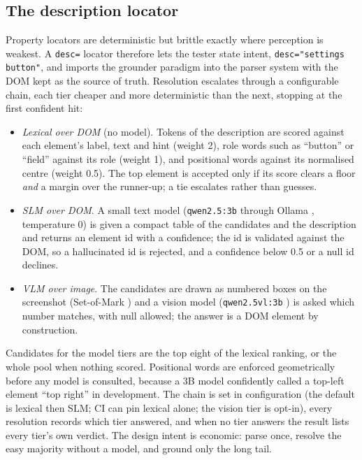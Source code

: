 \documentclass[conference]{IEEEtran}
\newcommand{\code}[1]{\texttt{#1}}
\begin{document}
\subsection{The description locator}
\label{sec:desc}
Property locators are deterministic but brittle exactly where perception is weakest. A \code{desc=} locator therefore lets the tester state intent, \code{desc="settings button"}, and imports the grounder paradigm into the parser system with the DOM kept as the source of truth. Resolution escalates through a configurable chain, each tier cheaper and more deterministic than the next, stopping at the first confident hit:
\begin{itemize}
  \item \emph{Lexical over DOM} (no model). Tokens of the description are scored against each element's label, text and hint (weight 2), role words such as ``button'' or ``field'' against its role (weight 1), and positional words against its normalised centre (weight 0.5). The top element is accepted only if its score clears a floor \emph{and} a margin over the runner-up; a tie escalates rather than guesses.
  \item \emph{SLM over DOM}. A small text model (\code{qwen2.5:3b} \cite{qwen25} through Ollama \cite{ollama}, temperature 0) is given a compact table of the candidates and the description and returns an element id with a confidence; the id is validated against the DOM, so a hallucinated id is rejected, and a confidence below 0.5 or a null id declines.
  \item \emph{VLM over image}. The candidates are drawn as numbered boxes on the screenshot (Set-of-Mark \cite{som2023}) and a vision model (\code{qwen2.5vl:3b} \cite{qwen25vl}) is asked which number matches, with null allowed; the answer is a DOM element by construction.
\end{itemize}
Candidates for the model tiers are the top eight of the lexical ranking, or the whole pool when nothing scored. Positional words are enforced geometrically before any model is consulted, because a 3B model confidently called a top-left element ``top right'' in development. The chain is set in configuration (the default is lexical then SLM; CI can pin lexical alone; the vision tier is opt-in), every resolution records which tier answered, and when no tier answers the result lists every tier's own verdict. The design intent is economic: parse once, resolve the easy majority without a model, and ground only the long tail.

\end{document}
